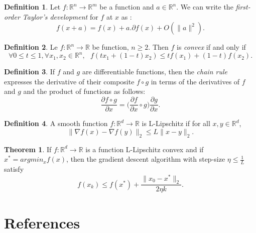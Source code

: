 \documentclass[10pt,a4paper]{article}
\theoremstyle{definition}
\newtheorem{definition}{Definition}
\theoremstyle{definition}
\newtheorem{theorem}{Theorem}
\theoremstyle{definition}
\begin{document}
\begin{definition}
Let $f: \mathbb{R}^n \rightarrow \mathbb{R}^m$ be a function and $a\in \mathbb{R}^n$.
We can write the \textit{first-order Taylor's development} for $f$ at $x$ as :
$$
f(x + a) = f(x) + a . \partial f(x) + O(\| a\|^2).
$$
\end{definition}

\begin{definition}
Le $f: \mathbb{R}^n \rightarrow \mathbb{R}$ be function, $n\geq 2$. Then $f$ is \textit{convex} if and only if
$$
\forall 0\leq t \leq 1, \forall x_1,x_2\in \mathbb{R}^n, \ \ \ f(tx_1 + (1-t)x_2) \leq tf(x_1) + (1-t)f(x_2).
$$
\end{definition}

\begin{definition}
If $f$ and $g$ are differentiable functions, then the \textit{chain rule} expresses the derivative of their composite $f \circ g$ in terms of the derivatives of $f$ and $g$ and the product of functions as follows:
$$
\frac{\partial f \circ g}{\partial x} = \Big(\frac{\partial f}{\partial x} \circ g\Big)\frac{\partial g}{\partial x}.
$$
\end{definition}

\begin{definition}
A smooth function $f:\mathbb{R}^d \to \mathbb{R}$ is L-Lipschitz if for all $x,y \in \mathbb{R}^d$,
$$
\| \nabla f(x) - \nabla f(y) \|_2 \leqslant L \|x-y\|_2.
$$
\end{definition}

\begin{theorem} \label{thmconvgd}
If $f : \mathbb{R}^d \to \mathbb{R}$ is a function L-Lipschitz convex and if $x^* = argmin_x f(x)$, then the gradient descent algorithm with step-size $\eta \leqslant \frac{1}{L}$ satisfy
$$
f(x_{k}) \leqslant f(x^*) + \frac{\|x_0 - x^* \|_2}{2\eta k} .
$$
\end{theorem}

\newpage
\section{References}

\nocite{*}


\end{document}
